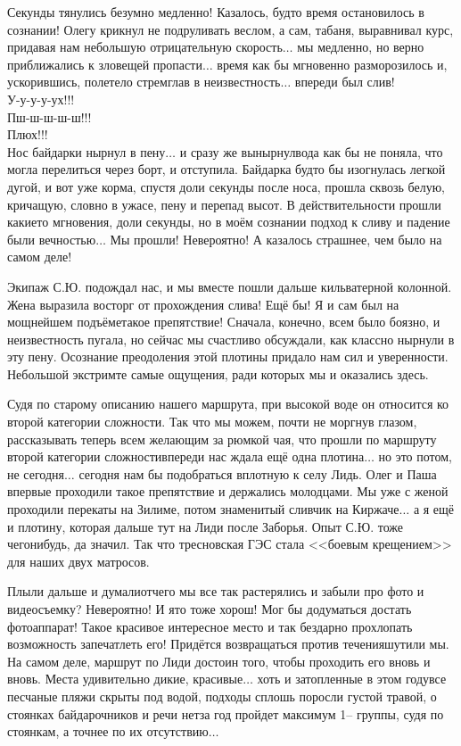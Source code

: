 Секунды тянулись безумно медленно! Казалось, будто время остановилось в сознании! Олегу крикнул не подруливать веслом, а сам, табаня, выравнивал курс, придавая нам небольшую отрицательную скорость$\ldots$ мы медленно, но верно приближались к зловещей пропасти$\ldots$ время как бы мгновенно разморозилось и, ускорившись, полетело стремглав в неизвестность$\ldots$ впереди был слив!\\
У-у-у-у-ух!!!\\
\hspace*{25mm} Пш-ш-ш-ш-ш!!!\\
\hspace*{56mm} Плюх!!!\\
\noindent Нос байдарки нырнул в пену$\ldots$ и сразу же вынырнул\mdash вода как бы не поняла, что могла перелиться через борт, и отступила. Байдарка будто бы изогнулась легкой дугой, и вот уже корма, спустя доли секунды после носа, прошла сквозь белую, кричащую, словно в ужасе, пену и перепад высот. В действительности прошли какие\sdash то мгновения, доли секунды, но в моём сознании подход к сливу и падение были вечностью$\ldots$ Мы прошли! Невероятно! А казалось страшнее, чем было на самом деле! 
 
Экипаж С.Ю. подождал нас, и мы вместе пошли дальше кильватерной колонной. Жена выразила восторг от прохождения слива! Ещё бы! Я и сам был на мощнейшем подъёме\mdash такое препятствие! Сначала, конечно, всем было боязно, и неизвестность пугала, но сейчас мы счастливо обсуждали, как классно нырнули в эту пену. Осознание преодоления этой плотины придало нам сил и уверенности. Небольшой экстрим\mdash те самые ощущения, ради которых мы и оказались здесь. 

Судя по старому описанию нашего маршрута, при высокой воде он относится ко второй категории сложности. Так что мы можем, почти не моргнув глазом, рассказывать теперь всем желающим за рюмкой чая, что прошли по маршруту второй категории сложности\mdash впереди нас ждала ещё одна плотина$\ldots$ но это потом, не сегодня$\ldots$ сегодня нам бы подобраться вплотную к селу Лидь. Олег и Паша впервые проходили такое препятствие и держались молодцами. Мы уже с женой проходили перекаты на Зилиме, потом знаменитый сливчик на Киржаче$\ldots$ а я ещё и плотину, которая дальше тут на Лиди после Заборья. Опыт С.Ю. тоже чего\sdash нибудь, да значил. Так что тресновская ГЭС стала <<боевым крещением>> для наших двух матросов.

Плыли дальше и думали\mdash отчего мы все так растерялись и забыли про фото и видеосъемку? Невероятно! И я\sdash то тоже хорош! Мог бы додуматься достать фотоаппарат! Такое красивое интересное место и так бездарно прохлопать возможность запечатлеть его! Придётся возвращаться против течения\mdash шутили мы. На самом деле, маршрут по Лиди достоин того, чтобы проходить его вновь и вновь. Места удивительно дикие, красивые$\ldots$ хоть и затопленные в этом году\mdash все песчаные пляжи скрыты под водой, подходы сплошь поросли густой травой, о стоянках байдарочников и речи нет\mdash за год пройдет максимум 1\thinspace\nobreakdash-- группы, судя по стоянкам, а точнее по их отсутствию$\ldots$

